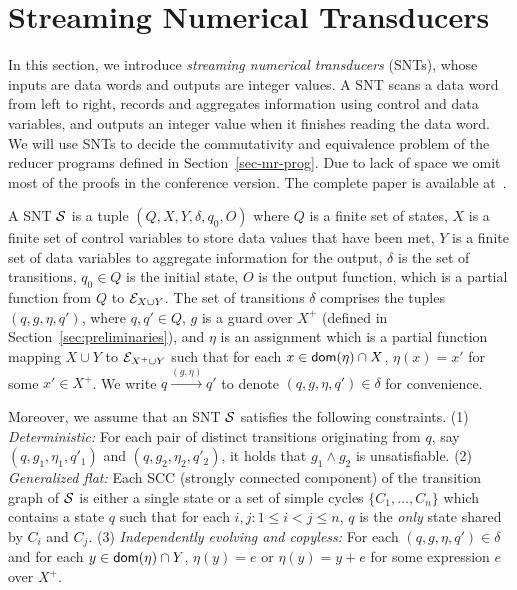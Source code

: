 


\section{Streaming Numerical Transducers}\label{sec:def-snt}

In this section, we introduce \emph{streaming numerical transducers} (SNTs), whose inputs are data words and outputs are integer values. A SNT scans a data word from left to right, records and aggregates information using control and data variables, and outputs an integer value when it finishes reading the data word. We will use SNTs to decide the commutativity and equivalence problem of the reducer programs defined in Section~\ref{sec-mr-prog}. 
Due to lack of space we omit most of the proofs in the conference version. The complete paper is available at~\cite{full-version}. 


A SNT ${\mathcal{S} }$ is a tuple $(Q, X, Y, \delta, q_0, O)$ where $Q$ is a finite set of states, $X$ is a finite set of control variables to store data values that have been met, $Y$ is a finite set of data variables to aggregate information for the output, $\delta$ is the set of transitions, $q_0 \in Q$ is the initial state, $O$ is the output function, which is a partial function from $Q$ to ${\mathcal{E} }_{X \cup Y}$.%
The set of transitions $\delta$ comprises the tuples $(q,  g, \eta, q')$, where $q,q'\in Q$, $g$ is a guard over $X^+$ (defined in Section~\ref{sec:preliminaries}), and $\eta$ is an assignment which is a partial function mapping $X \cup Y$  to ${\mathcal{E} }_{X^+ \cup Y}$ such that for each $x \in \mathsf{dom}(\eta) \cap X$, $\eta(x)=x'$ for some $x' \in X^+$. We write $q \xrightarrow{(g,\eta)} q'$ to denote $(q,g,\eta,q') \in \delta$ for convenience. 

Moreover, we assume that an SNT ${\mathcal{S} }$ satisfies the following constraints. (1) \emph{Deterministic:} For each pair of distinct transitions originating from $q$, say $(q, g_1, \eta_1,q'_1)$ and $(q, g_2,\eta_2,q'_2)$, it holds that $g_1 \wedge g_2$ is unsatisfiable. (2) \emph{Generalized flat:} Each SCC (strongly connected component) of the transition graph of ${\mathcal{S} }$ is either a single state or a set of simple cycles $\{C_1,\dots, C_n\}$ which contains a state $q$ such that for each $i,j: 1 \le i < j \le n$, $q$ is the \emph{only} state shared by $C_i$ and $C_j$. (3) \emph{Independently evolving and copyless:} For each $(q, g, \eta, q') \in \delta$ and for each $y \in \mathsf{dom}(\eta) \cap Y$, $\eta(y)=e$ or $\eta(y)=y+e$ for some expression $e$ over $X^+$.

